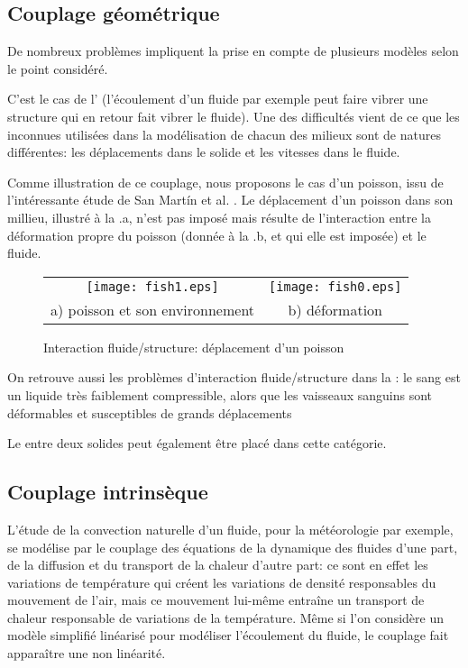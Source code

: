 \medskip
\subsection{Couplage géométrique}
De nombreux problèmes impliquent la prise en compte de plusieurs modèles selon le point
considéré.

C'est le cas de l'
(l'écoulement d'un fluide par exemple peut faire vibrer une structure qui en retour fait vibrer le fluide).
Une des difficultés vient de ce que les inconnues utilisées dans la modélisation de chacun
des milieux sont de natures différentes: les déplacements dans le solide et les vitesses dans le fluide.

Comme illustration de ce couplage, nous proposons le cas d'un poisson, issu de l'intéressante étude de
San Mart\'in et al. \cite{bib-Fish}.
Le déplacement d'un poisson dans son millieu, illustré à la .a, n'est pas imposé mais résulte
de l'interaction entre la déformation propre du poisson (donnée à la .b, et qui elle est imposée)
et le fluide.
\begin{figure}[htb]
\begin{center}
 \begin{tabular}{cc}
  \texttt{[image: fish1.eps]} &%
  \texttt{[image: fish0.eps]}\\
  a) poisson et son environnement & b) déformation
 \end{tabular}
\end{center}
\caption{Interaction fluide/structure: déplacement d'un poisson}
\label{Fig-fish}
\end{figure}

On retrouve aussi les problèmes d'interaction fluide/structure dans la :
le sang est un liquide très faiblement compressible, alors que les vaisseaux sanguins sont déformables et susceptibles
de grands déplacements

Le  entre deux solides peut également être placé dans cette
catégorie.


\medskip
\subsection{Couplage intrinsèque}

L'étude de la convection naturelle d'un fluide, pour la météorologie par exemple, se
modélise par le couplage des équations de la dynamique des fluides d'une part, de la
diffusion et du transport de la chaleur d'autre part: ce sont en effet les variations de
température qui créent les variations de densité responsables du mouvement de l'air,
mais ce mouvement lui-même entraîne un transport de chaleur responsable de
variations de la température. Même si l'on considère un modèle simplifié
linéarisé pour modéliser l'écoulement du fluide, le couplage fait apparaître une
non linéarité.

